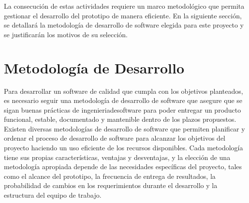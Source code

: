 La consecución de estas actividades requiere un marco metodológico que permita gestionar el desarrollo del prototipo de manera eficiente. En la siguiente sección, se detallará la metodología de desarrollo de software elegida para este proyecto y se justificarán los motivos de su selección.



\section{Metodología de Desarrollo}
\label{sec:software-method}

Para desarrollar un \gls{software} de calidad que cumpla con los objetivos planteados, es necesario seguir una metodología de desarrollo de software que asegure que se sigan buenas prácticas de \gls{ingenieriadesoftware} para poder entregar un producto funcional, estable, documentado y mantenible dentro de los plazos propuestos. Existen diversas metodologías de desarrollo de software que permiten planificar y ordenar el proceso de desarrollo de software para alcanzar los objetivos del proyecto haciendo un uso eficiente de los recursos disponibles. Cada metodología tiene sus propias características, ventajas y desventajas, y la elección de una metodología apropiada depende de las necesidades específicas del proyecto, tales como el alcance del prototipo, la frecuencia de entrega de resultados, la probabilidad de cambios en los requerimientos durante el desarrollo y la estructura del equipo de trabajo.

